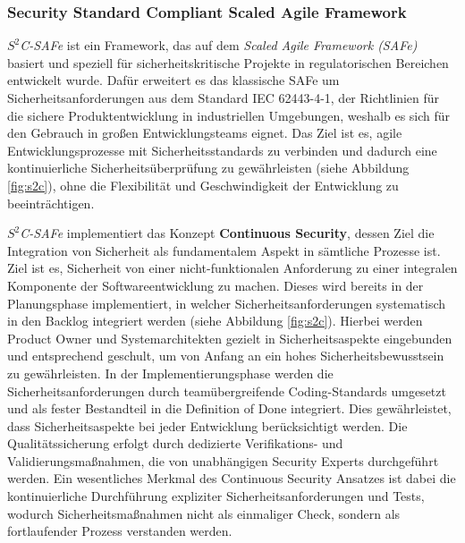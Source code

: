 \documentclass[acmtog]{acmart}
\begin{document}
\subsubsection{Security Standard Compliant Scaled Agile Framework}

\textit{$S^2$C-SAFe} ist ein Framework, das auf dem \textit{Scaled Agile Framework (SAFe)} basiert und speziell für sicherheitskritische Projekte in regulatorischen Bereichen entwickelt wurde. 
Dafür erweitert es das klassische SAFe um Sicherheitsanforderungen aus dem Standard IEC 62443-4-1, der Richtlinien für die sichere Produktentwicklung
in industriellen Umgebungen, weshalb es sich für den Gebrauch in großen Entwicklungsteams eignet. \cite{moyon_how_2020} Das Ziel ist es, agile Entwicklungsprozesse mit Sicherheitsstandards zu verbinden und dadurch eine kontinuierliche Sicherheitsüberprüfung zu gewährleisten (siehe Abbildung \ref{fig:s2c}), ohne 
die Flexibilität und Geschwindigkeit der Entwicklung zu beeinträchtigen. \cite{moyon_how_2020}

\textit{$S^2$C-SAFe} implementiert das Konzept \textbf{Continuous Security}, dessen Ziel die Integration von Sicherheit als fundamentalem Aspekt in sämtliche Prozesse ist. 
Ziel ist es, Sicherheit von einer nicht-funktionalen Anforderung zu einer integralen Komponente der Softwareentwicklung zu machen.
Dieses wird bereits in der Planungsphase implementiert, in welcher Sicherheitsanforderungen systematisch in den Backlog integriert werden (siehe Abbildung \ref{fig:s2c}). \cite{moyon_how_2020} 
Hierbei werden Product Owner und Systemarchitekten gezielt in Sicherheitsaspekte eingebunden und entsprechend geschult, um von Anfang an ein hohes Sicherheitsbewusstsein zu gewährleisten. 
In der Implementierungsphase werden die Sicherheitsanforderungen durch teamübergreifende Coding-Standards umgesetzt und als fester Bestandteil in die Definition of Done integriert. 
Dies gewährleistet, dass Sicherheitsaspekte bei jeder Entwicklung berücksichtigt werden. \cite{moyon_how_2020}
Die Qualitätssicherung erfolgt durch dedizierte Verifikations- und Validierungsmaßnahmen, die von unabhängigen Security Experts durchgeführt werden. 
Ein wesentliches Merkmal des Continuous Security Ansatzes ist dabei die kontinuierliche Durchführung expliziter Sicherheitsanforderungen und Tests, wodurch Sicherheitsmaßnahmen nicht als einmaliger Check, 
sondern als fortlaufender Prozess verstanden werden. \cite{moyon_how_2020}
\end{document}
